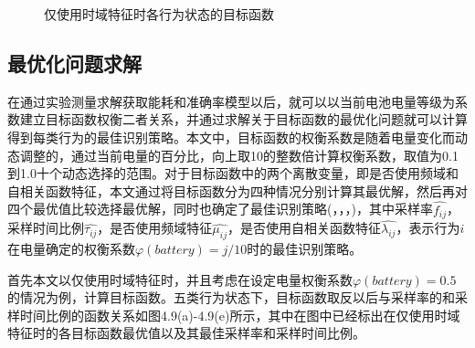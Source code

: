 \begin{figure}[!htb]
    \centering
    \caption{仅使用时域特征时各行为状态的目标函数}
\end{figure}

\subsection{最优化问题求解}
\par 在通过实验测量求解获取能耗和准确率模型以后，就可以以当前电池电量等级为系数建立目标函数权衡二者关系，并通过求解关于目标函数的最优化问题就可以计算得到每类行为的最佳识别策略。本文中，目标函数的权衡系数是随着电量变化而动态调整的，通过当前电量的百分比，向上取10的整数倍计算权衡系数，取值为0.1到1.0十个动态选择的范围。对于目标函数中的两个离散变量，即是否使用频域和自相关函数特征，本文通过将目标函数分为四种情况分别计算其最优解，然后再对四个最优值比较选择最优解，同时也确定了最佳识别策略(，\bm{$\widehat{\tau}$}，\bm{$\widehat{\mu}$}，\bm{$\widehat{\lambda}$})，其中采样率$\widehat{f_{ij}}$，采样时间比例$\widehat{\tau_{ij}}$，是否使用频域特征$\widehat{\mu_{ij}}$，是否使用自相关函数特征$\widehat{\lambda_{ij}}$，表示行为$i$在电量确定的权衡系数$\varphi (battery) = j/10$时的最佳识别策略。

\par 首先本文以仅使用时域特征时，并且考虑在设定电量权衡系数$\varphi (battery) = 0.5$的情况为例，计算目标函数。五类行为状态下，目标函数取反以后与采样率的和采样时间比例的函数关系如图4.9(a)-4.9(e)所示，其中在图中已经标出在仅使用时域特征时的各目标函数最优值以及其最佳采样率和采样时间比例。




